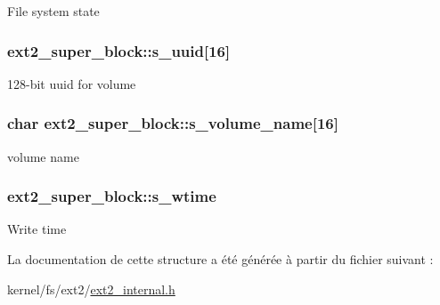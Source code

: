 File system state \hypertarget{structext2__super__block_a1a546d295c2dc760ece8bf44c7623eb3}{
\subsubsection[{s\-\_\-uuid}]{ ext2\-\_\-super\-\_\-block\-::s\-\_\-uuid\mbox{[}16\mbox{]}}}\label{structext2__super__block_a1a546d295c2dc760ece8bf44c7623eb3}
128-\/bit uuid for volume \hypertarget{structext2__super__block_aafa5ddd1cf9fbf19aa2b80e83bff5a43}{
\subsubsection[{s\-\_\-volume\-\_\-name}]{\setlength{\rightskip}{0pt plus 5cm}char ext2\-\_\-super\-\_\-block\-::s\-\_\-volume\-\_\-name\mbox{[}16\mbox{]}}}\label{structext2__super__block_aafa5ddd1cf9fbf19aa2b80e83bff5a43}
volume name \hypertarget{structext2__super__block_a97c255a8e87dbea1ab953b0a8fce054d}{
\subsubsection[{s\-\_\-wtime}]{ ext2\-\_\-super\-\_\-block\-::s\-\_\-wtime}}\label{structext2__super__block_a97c255a8e87dbea1ab953b0a8fce054d}
Write time 

La documentation de cette structure a été générée à partir du fichier suivant \-:\begin{DoxyCompactItemize}
\item 
kernel/fs/ext2/\hyperlink{ext2__internal_8h}{ext2\-\_\-internal.\-h}\end{DoxyCompactItemize}
